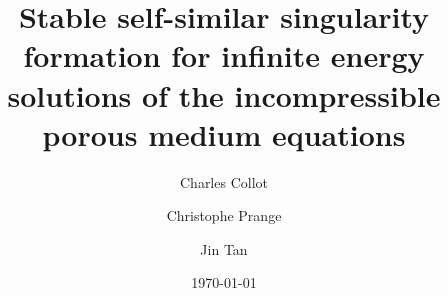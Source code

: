 \documentclass[12pt]{amsart}
\numberwithin{equation}{section}
\numberwithin{equation}{section}
\begin{document}
\title[]{Stable self-similar singularity formation for infinite energy solutions of the incompressible porous medium equations}


\author[C. Collot]{Charles Collot}
\address[C. Collot]{\newline  Laboratoire de Math\'{e}matiques AGM, UMR CNRS 8088, Cergy Paris Universit\'{e}, 2 Avenue Adolphe Chauvin, 95302     Cergy-Pontoise Cedex, France}

\author[C. Prange]{Christophe Prange}
\address[C. Prange]{\newline  Laboratoire de Math\'{e}matiques AGM, UMR CNRS 8088, Cergy Paris Universit\'{e}, 2 Avenue Adolphe Chauvin, 95302     Cergy-Pontoise Cedex, France}

 \author[J. Tan]{Jin Tan}
\address[J. Tan]{\newline Department of Mathematics,The Chinese University of Hong Kong, Shatin, Hong Kong, P.R. China}





\date{\today}
 \subjclass[2010]{ }
\end{document}
